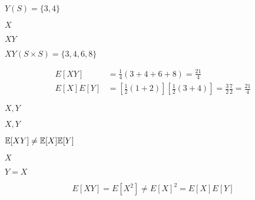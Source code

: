 \documentclass[10pt]{book}
\begin{document}
\begin{mdSnippets}
\begin{mdInlineSnippet}%
$Y(S) = \{3,4\}$\end{mdInlineSnippet}%
\begin{mdInlineSnippet}[02129bb861061d1a052c592e2dc6b383]%
$X$\end{mdInlineSnippet}%
\begin{mdInlineSnippet}%
$XY$\end{mdInlineSnippet}%
\begin{mdInlineSnippet}[883cc38bf0b5b7437a35250a64293c05]%
$XY(S \times S) = \{3,4,6,8\}$\end{mdInlineSnippet}%
\begin{mdDisplaySnippet}%
\[%
\begin{aligned}
E[XY] &= \frac{1}{4} (3 + 4 + 6 + 8) = \frac{21}{4} \\
E[X]E[Y] &= \left[\frac{1}{2}(1 + 2) \right] \left[\frac{1}{2} ( 3 + 4) \right] = 
\frac{3}{2}\frac{7}{2} = \frac{21}{4}
\end{aligned}
\]%
\end{mdDisplaySnippet}%
\begin{mdInlineSnippet}[d23a4ce8bca0f4891e037439a79b45a6]%
$X,Y$\end{mdInlineSnippet}%
\begin{mdInlineSnippet}[d23a4ce8bca0f4891e037439a79b45a6]%
$X,Y$\end{mdInlineSnippet}%
\begin{mdInlineSnippet}[44e7a3d5b6f36e04a9b6f5c297aeab15]%
$\mathbb{E}[XY] \neq \mathbb{E}[X]\mathbb{E}[Y]$\end{mdInlineSnippet}%
\begin{mdInlineSnippet}[02129bb861061d1a052c592e2dc6b383]%
$X$\end{mdInlineSnippet}%
\begin{mdInlineSnippet}%
$Y = X$\end{mdInlineSnippet}%
\begin{mdDisplaySnippet}[7630b507a469e07928383907a1bd8b88]%
\[%
E[XY] = E[X^2] \neq E[X]^2 = E[X]E[Y]
\]%
\end{mdDisplaySnippet}%

\end{mdSnippets}
\end{document}
